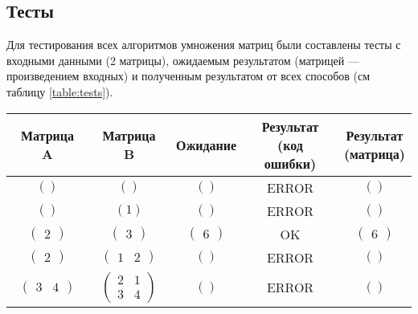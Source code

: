 \vspace{0.25cm}
\subsection{Тесты}

\hspace{1.25cm}
Для тестирования всех алгоритмов умножения матриц были составлены тесты с входными данными (2 матрицы), ожидаемым результатом (матрицей --- произведением входных) и полученным результатом от всех способов (см таблицу \ref{table:tests}).

\vspace{0.25cm}
\begin{table}[H]
    \centering
    \renewcommand{\arraystretch}{1.5} %
    \begin{tabular}{|c|c|c|c|c|}
        \hline
        \textbf{Матрица A} & \textbf{Матрица B} & \textbf{Ожидание} & \makecell{\textbf{Результат}\\ \textbf{(код ошибки)}} & \makecell{\textbf{Результат}\\ \textbf{(матрица)}} \\
        \hline
        $\left( \right)$ & $\left( \right)$ & $\left( \right)$ & ERROR & $\left( \right)$ \\
        $\left( \right)$ & $\left( 1 \right)$ & $\left( \right)$ & ERROR & $\left( \right)$ \\
        $\left( \begin{matrix} 2 \end{matrix} \right)$ & $\left( \begin{matrix} 3 \end{matrix} \right)$ & $\left( \begin{matrix} 6 \end{matrix} \right)$ & OK & $\left( \begin{matrix} 6 \end{matrix} \right)$ \\
        $\left( \begin{matrix} 2 \end{matrix} \right)$ & $\left( \begin{matrix} 1 & 2 \end{matrix} \right)$ & $\left( \right)$ & ERROR & $\left( \right)$ \\
        $\left( \begin{matrix} 3 & 4 \end{matrix} \right)$ & $\left( \begin{matrix} 2 & 1 \\ 3 & 4 \end{matrix} \right)$ & $\left( \right)$ & ERROR & $\left( \right)$ \\

\end{tabular}
\end{table}
